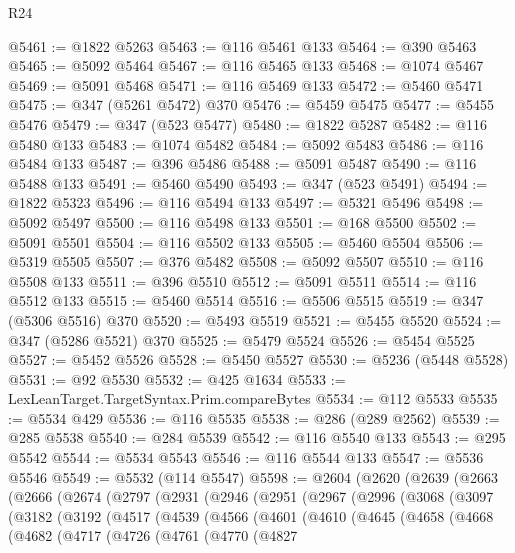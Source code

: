 \begin{lexlean}{R24}
\begin{coremodule}
@5461 := @1822 @5263
@5463 := @116 @5461 @133
@5464 := @390 @5463
@5465 := @5092 @5464
@5467 := @116 @5465 @133
@5468 := @1074 @5467
@5469 := @5091 @5468
@5471 := @116 @5469 @133
@5472 := @5460 @5471
@5475 := @347 (@5261 @5472) @370
@5476 := @5459 @5475
@5477 := @5455 @5476
@5479 := @347 (@523 @5477)
@5480 := @1822 @5287
@5482 := @116 @5480 @133
@5483 := @1074 @5482
@5484 := @5092 @5483
@5486 := @116 @5484 @133
@5487 := @396 @5486
@5488 := @5091 @5487
@5490 := @116 @5488 @133
@5491 := @5460 @5490
@5493 := @347 (@523 @5491)
@5494 := @1822 @5323
@5496 := @116 @5494 @133
@5497 := @5321 @5496
@5498 := @5092 @5497
@5500 := @116 @5498 @133
@5501 := @168 @5500
@5502 := @5091 @5501
@5504 := @116 @5502 @133
@5505 := @5460 @5504
@5506 := @5319 @5505
@5507 := @376 @5482
@5508 := @5092 @5507
@5510 := @116 @5508 @133
@5511 := @396 @5510
@5512 := @5091 @5511
@5514 := @116 @5512 @133
@5515 := @5460 @5514
@5516 := @5506 @5515
@5519 := @347 (@5306 @5516) @370
@5520 := @5493 @5519
@5521 := @5455 @5520
@5524 := @347 (@5286 @5521) @370
@5525 := @5479 @5524
@5526 := @5454 @5525
@5527 := @5452 @5526
@5528 := @5450 @5527
@5530 := @5236 (@5448 @5528)
@5531 := @92 @5530
@5532 := @425 @1634
@5533 := LexLeanTarget.TargetSyntax.Prim.compareBytes
@5534 := @112 @5533
@5535 := @5534 @429
@5536 := @116 @5535
@5538 := @286 (@289 @2562)
@5539 := @285 @5538
@5540 := @284 @5539
@5542 := @116 @5540 @133
@5543 := @295 @5542
@5544 := @5534 @5543
@5546 := @116 @5544 @133
@5547 := @5536 @5546
@5549 := @5532 (@114 @5547)
@5598 := @2604
    (@2620
      (@2639
        (@2663
          (@2666
            (@2674
              (@2797
                (@2931
                  (@2946
                    (@2951
                      (@2967
                        (@2996
                          (@3068
                            (@3097
                              (@3182
                                (@3192
                                  (@4517
                                    (@4539
                                      (@4566
                                        (@4601
                                          (@4610
                                            (@4645
                                              (@4658
                                                (@4668
                                                  (@4682
                                                    (@4717
                                                      (@4726
                                                        (@4761
                                                          (@4770
                                                            (@4827

\end{coremodule}
\end{lexlean}

